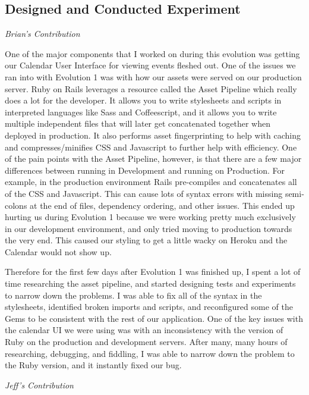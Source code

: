 \documentclass[11pt]{article}
\begin{document}
\subsection{Designed and Conducted Experiment}

\textit{Brian's Contribution}

One of the major components that I worked on during this evolution was getting our Calendar User Interface for viewing events fleshed out. One of the issues we ran into with Evolution 1 was with how our assets were served on our production server. Ruby on Rails leverages a resource called the Asset Pipeline which really does a lot for the developer. It allows you to write stylesheets and scripts in interpreted languages like Sass and Coffeescript, and it allows you to write multiple independent files that will later get concatenated together when deployed in production. It also performs asset fingerprinting to help with caching and compresses/minifies CSS and Javascript to further help with efficiency. One of the pain points with the Asset Pipeline, however, is that there are a few major differences between running in Development and running on Production. For example, in the production environment Rails pre-compiles and concatenates all of the CSS and Javascript. This can cause lots of syntax errors with missing semi-colons at the end of files, dependency ordering, and other issues. This ended up hurting us during Evolution 1 because we were working pretty much exclusively in our development environment, and only tried moving to production towards the very end. This caused our styling to get a little wacky on Heroku and the Calendar would not show up. 

Therefore for the first few days after Evolution 1 was finished up, I spent a lot of time researching the asset pipeline, and started designing tests and experiments to narrow down the problems. I was able to fix all of the syntax in the stylesheets, identified broken imports and scripts, and reconfigured some of the Gems to be consistent with the rest of our application. One of the key issues with the calendar UI we were using was with an inconsistency with the version of Ruby on the production and development servers. After many, many hours of researching, debugging, and fiddling, I was able to narrow down the problem to the Ruby version, and it instantly fixed our bug. 

\textit{Jeff's Contribution}
\end{document}
